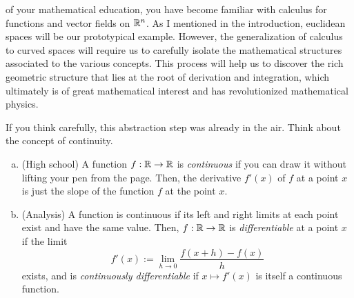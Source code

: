  of your mathematical education, you have become familiar with calculus for functions and vector fields on $\mathbb{R}^n$.
As I mentioned in the introduction, euclidean spaces will be our prototypical example.
However, the generalization of calculus to curved spaces will require us to carefully isolate the mathematical structures associated to the various concepts.
This process will help us to discover the rich geometric structure that lies at the root of derivation and integration, which ultimately is of great mathematical interest and has revolutionized mathematical physics.

If you think carefully, this abstraction step was already in the air. Think about the concept of continuity.

\begin{enumerate}[a)]
  \item (High school) A function $f:\mathbb{R}\to\mathbb{R}$ is \emph{continuous} if you can draw it without lifting your pen from the page.
  Then, the derivative $f'(x)$ of $f$ at a point $x$ is just the slope of the function $f$ at the point $x$.
  
  \item (Analysis) A function is continuous if its left and right limits at each point exist and have the same value.
  Then, $f:\mathbb{R}\to\mathbb{R}$ is \emph{differentiable} at a point $x$ if the limit
  \begin{equation}
    f'(x) := \lim_{h\to0} \frac{f(x+h) - f(x)}{h} 
  \end{equation}
  exists, and is \emph{continuously differentiable} if $x\mapsto f'(x)$ is itself a continuous function.
  

\end{enumerate}
